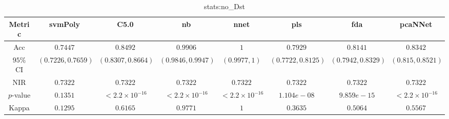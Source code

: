 \begin{table}[!ht]
	\centering
	\begin{tabular}{|c|c|c|c|c|c|c|c|}
		\hline
		Metric & svmPoly & C5.0 & nb & nnet & pls & fda & pcaNNet \\ \hline
		Acc & $0.7447$ & $0.8492$ & $0.9906$ & $1$ & $0.7929$ & $0.8141$ & $0.8342$ \\ \hline
		$95\%$ CI & $(0.7226, 0.7659)$ & $(0.8307, 0.8664)$ & $(0.9846, 0.9947)$ & $(0.9977, 1)$ & $(0.7722, 0.8125)$ & $(0.7942, 0.8329)$ & $(0.815, 0.8521)$ \\ \hline
		NIR & $0.7322$ & $0.7322$ & $0.7322$ & $0.7322$ & $0.7322$ & $0.7322$ & $0.7322$ \\ \hline
		$p$-value & $0.1351$ & $< 2.2 \times {10}^{-16}$ & $< 2.2 \times {10}^{-16}$ & $< 2.2 \times {10}^{-16}$ & $1.104e-08$ & $9.859e-15$ & $< 2.2 \times {10}^{-16}$ \\ \hline
		Kappa & $0.1295$ & $0.6165$ & $0.9771$ & $1$ & $0.3635$ & $0.5064$ & $0.5567$ \\ \hline
	\end{tabular}
	\caption{stats:no_Dst}
	\label{tab:stats:no_Dst}
\end{table}
